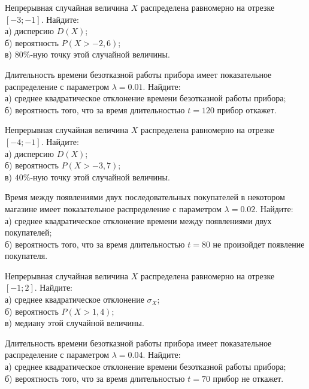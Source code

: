 \vfill

\newpage\setcounter{zad}{0}

\z Непрерывная случайная величина $X$ распределена равномерно на отрезке $[-3; -1]$. Найдите: \\ \quad а) дисперсию $D(X)$; \\ \quad б) вероятность $P(X>-2{,}6)$; \\ \quad в) $80\%$-ную точку этой случайной величины.


\vfill

\z Длительность времени безотказной работы прибора имеет показательное распределение с параметром $\lambda = 0.01$. Найдите: \\ \quad а) среднее квадратическое отклонение времени безотказной работы прибора; \\ \quad б) вероятность того, что за время длительностью $t = 120$ прибор  откажет.
 

\vfill

\newpage\setcounter{zad}{0}

\z Непрерывная случайная величина $X$ распределена равномерно на отрезке $[-4; -1]$. Найдите: \\ \quad а) дисперсию $D(X)$; \\ \quad б) вероятность $P(X>-3{,}7)$; \\ \quad в) $40\%$-ную точку этой случайной величины.


\vfill

\z Время между появлениями двух последовательных покупателей в некотором магазине имеет показательное распределение с параметром $\lambda = 0.02$. Найдите: \\ \quad а) среднее квадратическое отклонение времени между появлениями двух покупателей; \\ \quad б) вероятность того, что за время длительностью $t = 80$ не произойдет появление покупателя.
 

\vfill

\newpage\setcounter{zad}{0}

\z Непрерывная случайная величина $X$ распределена равномерно на отрезке $[-1; 2]$. Найдите: \\ \quad а) среднее квадратическое отклонение $\sigma_X$; \\ \quad б) вероятность $P(X>1{,}4)$; \\ \quad в) медиану этой случайной величины.


\vfill

\z Длительность времени безотказной работы прибора имеет показательное распределение с параметром $\lambda = 0.04$. Найдите: \\ \quad а) среднее квадратическое отклонение времени безотказной работы прибора; \\ \quad б) вероятность того, что за время длительностью $t = 70$ прибор не откажет.
 

